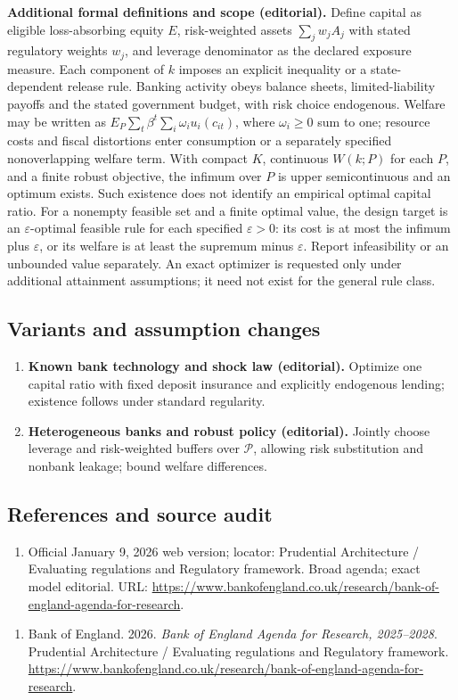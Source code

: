 \documentclass[11pt,a4paper]{article}
\begin{document}
\textbf{Additional formal definitions and scope (editorial).} Define capital as eligible loss-absorbing equity \(E\), risk-weighted assets \(\sum_j w_j A_j\) with stated regulatory weights \(w_j\), and leverage denominator as the declared exposure measure. Each component of \(k\) imposes an explicit inequality or a state-dependent release rule. Banking activity obeys balance sheets, limited-liability payoffs and the stated government budget, with risk choice endogenous. Welfare may be written as \(E_P\sum_t\beta^t\sum_i\omega_i u_i(c_{it})\), where \(\omega_i\geq0\) sum to one; resource costs and fiscal distortions enter consumption or a separately specified nonoverlapping welfare term. With compact \(K\), continuous \(W(k;P)\) for each \(P\), and a finite robust objective, the infimum over \(P\) is upper semicontinuous and an optimum exists. Such existence does not identify an empirical optimal capital ratio. For a nonempty feasible set and a finite optimal value, the design target is an \(\varepsilon\)-optimal feasible rule for each specified \(\varepsilon>0\): its cost is at most the infimum plus \(\varepsilon\), or its welfare is at least the supremum minus \(\varepsilon\). Report infeasibility or an unbounded value separately. An exact optimizer is requested only under additional attainment assumptions; it need not exist for the general rule class.
\subsection*{Variants and assumption changes}
\begin{enumerate}
\item \textbf{Known bank technology and shock law (editorial).} Optimize one capital ratio with fixed deposit insurance and explicitly endogenous lending; existence follows under standard regularity.
\item \textbf{Heterogeneous banks and robust policy (editorial).} Jointly choose leverage and risk-weighted buffers over \(\mathcal P\), allowing risk substitution and nonbank leakage; bound welfare differences.
\end{enumerate}
\subsection*{References and source audit}
\begin{enumerate}
\item Official January 9, 2026 web version; locator: Prudential Architecture / Evaluating regulations and Regulatory framework. Broad agenda; exact model editorial. URL: \url{https://www.bankofengland.co.uk/research/bank-of-england-agenda-for-research}.
\end{enumerate}
\begin{enumerate}\raggedright
\item\hypertarget{definitions:source:30007602:1}{} Bank of England. 2026. \emph{Bank of England Agenda for Research, 2025–2028}. Prudential Architecture / Evaluating regulations and Regulatory framework.
\url{https://www.bankofengland.co.uk/research/bank-of-england-agenda-for-research}.
\end{enumerate}
\end{document}
